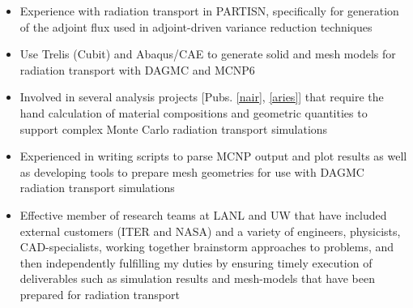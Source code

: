\begin{center}
\begin{minipage}{\textwidth}
\begin{itemize}[leftmargin=.875in,rightmargin=.875in,itemsep=1.0mm]
              \item Experience with radiation transport in PARTISN, specifically
                    for generation of the adjoint flux used in adjoint-driven 
                    variance reduction techniques
              \item Use Trelis (Cubit) and Abaqus/CAE to generate solid and 
                    mesh models for radiation transport with DAGMC and MCNP6
	       \item Involved in several analysis projects
		      [Pubs. \ref{nair}, \ref{aries}]	       
		     that require the hand calculation of material compositions
		     and geometric quantities to support complex Monte
		     Carlo radiation transport simulations
	       \item Experienced in writing scripts to parse MCNP output
	               and plot results as well as developing tools to 
		       prepare mesh geometries for use with DAGMC
		       radiation transport simulations
		\item Effective member of research teams at LANL and
		      UW that have included external customers (ITER and NASA) 
                      and a variety of engineers, physicists, CAD-specialists,
                      working together brainstorm approaches to problems,
                      and then independently fulfilling my duties
                      by ensuring timely execution of deliverables such as
                      simulation results and mesh-models
                      that have been prepared for radiation transport

\end{itemize}
\end{minipage}
\end{center}
